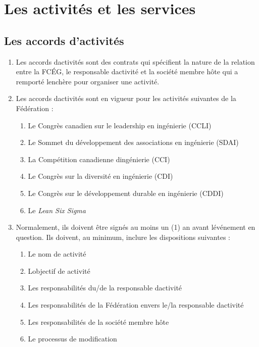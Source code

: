 \section{Les activités et les services}
\label{les-activites-et-les-services}

\subsection{Les accords d'activités}
\label{les-accords-d-activites}

\begin{enumerate}
 \item
  Les accords d\textquotesingle activités sont des contrats qui spécifient la nature de la relation entre la FCÉG, le responsable d\textquotesingle activité et la société membre hôte qui a remporté l\textquotesingle enchère pour organiser une activité.
 \item
  Les accords d\textquotesingle activités sont en vigueur pour les activités suivantes de la Fédération :

  \begin{enumerate}
   \item
    Le Congrès canadien sur le leadership en ingénierie (CCLI)
   \item
    Le Sommet du développement des associations en ingénierie (SDAI)
   \item
    La Compétition canadienne d\textquotesingle ingénierie (CCI)
   \item
    Le Congrès sur la diversité en ingénierie (CDI)
   \item
    Le Congrès sur le développement durable en ingénierie (CDDI)
   \item
    Le \emph{Lean Six Sigma}
  \end{enumerate}
 \item
  Normalement, ils doivent être signés au moins un (1) an avant l\textquotesingle événement en question. Ils doivent, au minimum, inclure les dispositions suivantes :

  \begin{enumerate}
   \item
    Le nom de activité
   \item
    L\textquotesingle objectif de activité
   \item
    Les responsabilités du/de la responsable d\textquotesingle activité
   \item
    Les responsabilités de la Fédération envers le/la responsable d\textquotesingle activité
   \item
    Les responsabilités de la société membre hôte
   \item
    Le processus de modification
  \end{enumerate}
\end{enumerate}

